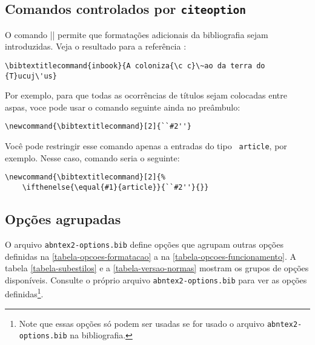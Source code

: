 \documentclass[a4paper]{ltxdoc}
\begin{document}
\subsection{Comandos controlados por \texttt{citeoption}}

\DescribeMacro{\bibtextitlecommand}
\label{sec-titlecommand}
O comando |\bibtextitlecommand|
permite que formatações adicionais da bibliografia sejam introduzidas. Veja o
resultado para a referência :

\begin{verbatim}
\bibtextitlecommand{inbook}{A coloniza{\c c}\~ao da terra do {T}ucuj\'us}
\end{verbatim}

Por exemplo, para que todas as ocorrências de títulos sejam colocadas entre
aspas, voce pode usar o comando seguinte ainda no preâmbulo:

\begin{verbatim}
\newcommand{\bibtextitlecommand}[2]{``#2''}
\end{verbatim}

Você pode restringir esse comando apenas a entradas do tipo \texttt{
article}, por exemplo. Nesse caso, comando seria o seguinte:

\begin{verbatim}
\newcommand{\bibtextitlecommand}[2]{%
	\ifthenelse{\equal{#1}{article}}{``#2''}{}}
\end{verbatim}


\subsection{Opções agrupadas}

O arquivo \texttt{abntex2-options.bib} define opções que agrupam outras opções
definidas na \autoref{tabela-opcoes-formatacao} a na
\autoref{tabela-opcoes-funcionamento}. A tabela \autoref{tabela-subestilos} e a
\autoref{tabela-versao-normas} mostram os grupos de opções disponíveis. Consulte
o próprio arquivo \texttt{abntex2-options.bib} para ver as opções 
definidas\footnote{Note que essas opções só podem ser usadas se for usado o
arquivo \texttt{abntex2-options.bib} na bibliografia.}.
\end{document}
